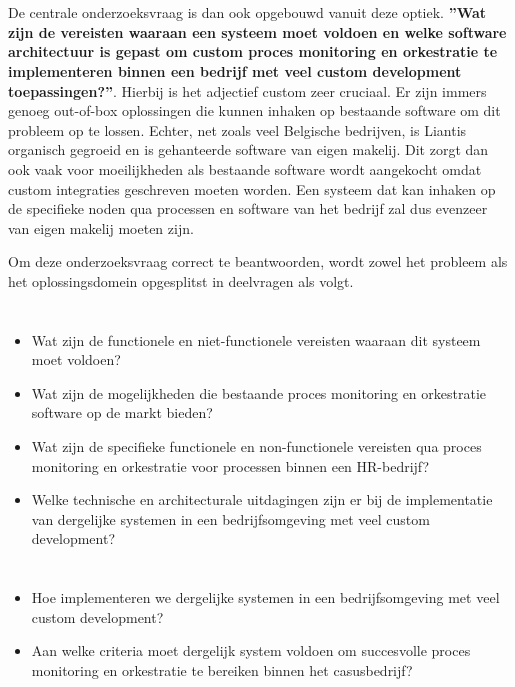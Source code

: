 \section{}%
\label{sec:onderzoeksvraag}

De centrale onderzoeksvraag is dan ook opgebouwd vanuit deze optiek. \textbf{”Wat zijn de vereisten waaraan een systeem moet voldoen en welke software architectuur is gepast om custom proces monitoring en orkestratie te implementeren binnen een bedrijf met veel custom development toepassingen?”}. Hierbij is het adjectief custom zeer cruciaal. Er zijn immers genoeg out-of-box oplossingen die kunnen inhaken op bestaande software om dit probleem op te lossen. Echter, net zoals veel Belgische bedrijven, is Liantis organisch gegroeid en is gehanteerde software van eigen makelij. Dit zorgt dan ook vaak voor moeilijkheden als bestaande software wordt aangekocht omdat custom integraties geschreven moeten worden. Een systeem dat kan inhaken op de specifieke noden qua processen en software van het bedrijf zal dus evenzeer van eigen makelij moeten zijn.\newline

Om deze onderzoeksvraag correct te beantwoorden, wordt zowel het probleem als het oplossingsdomein opgesplitst in deelvragen als volgt.

\section{}%
\label{sec:probleemdomein}
\begin{itemize}
  \item Wat zijn de functionele en niet-functionele vereisten waaraan dit systeem moet voldoen?
  \item Wat zijn de mogelijkheden die bestaande proces monitoring en orkestratie software op de markt bieden?
  \item Wat zijn de specifieke functionele en non-functionele vereisten qua proces monitoring en orkestratie voor processen binnen een HR-bedrijf?
  \item Welke technische en architecturale uitdagingen zijn er bij de implementatie van dergelijke systemen in een bedrijfsomgeving met veel custom development?
\end{itemize}

\section{}%
\label{sec:oplossingsdomein}
\begin{itemize}
  \item Hoe implementeren we dergelijke systemen in een bedrijfsomgeving met veel custom development?
  \item Aan welke criteria moet dergelijk system voldoen om succesvolle proces monitoring en orkestratie te bereiken binnen het casusbedrijf?
\end{itemize}

